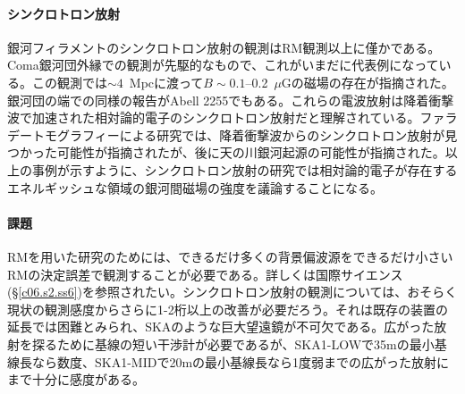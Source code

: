 \paragraph{シンクロトロン放射}

銀河フィラメントのシンクロトロン放射の観測はRM観測以上に僅かである。Coma銀河団外縁での観測\citep{1989Natur.341..720K}が先駆的なもので、これがいまだに代表例になっている。この観測では$\sim 4$~Mpcに渡って$B\sim 0.1$--0.2~$\mu$Gの磁場の存在が指摘された。銀河団の端での同様の報告がAbell 2255でもある\citep{2008A&A...481L..91P}。これらの電波放射は降着衝撃波で加速された相対論的電子のシンクロトロン放射だと理解されている。ファラデートモグラフィーによる研究では、降着衝撃波からのシンクロトロン放射が見つかった可能性が指摘されたが\citep{2005A&A...441..931D}、後に天の川銀河起源の可能性が指摘された\citep{2011A&A...526A...9B}。以上の事例が示すように、シンクロトロン放射の研究では相対論的電子が存在するエネルギッシュな領域の銀河間磁場の強度を議論することになる。

\paragraph{課題}

RMを用いた研究のためには、できるだけ多くの背景偏波源をできるだけ小さいRMの決定誤差で観測することが必要である。詳しくは国際サイエンス(\S \ref{c06.s2.ss6})を参照されたい。シンクロトロン放射の観測については、おそらく現状の観測感度からさらに1-2桁以上の改善が必要だろう。それは既存の装置の延長では困難とみられ、SKAのような巨大望遠鏡が不可欠である。広がった放射を探るために基線の短い干渉計が必要であるが、SKA1-LOWで35mの最小基線長なら数度、SKA1-MIDで20mの最小基線長なら1度弱までの広がった放射にまで十分に感度がある。

